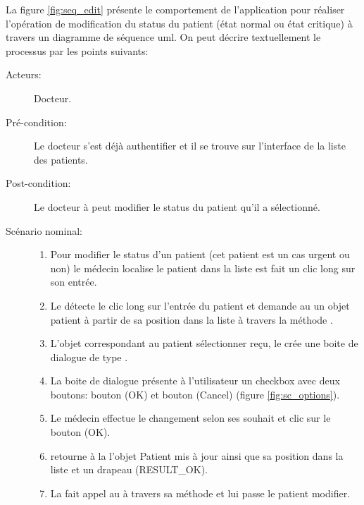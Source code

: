 La figure \ref{fig:seq_edit} présente le comportement de l'application pour réaliser l'opération de modification du status du patient (état normal ou état critique) à travers un diagramme de séquence \gls{uml}. On peut décrire textuellement le processus par les points suivants:

\begin{description}

\item[Acteurs:] Docteur.

\item[Pré-condition:] Le docteur s'est déjà authentifier et il se trouve sur l'interface de la liste des patients.

\item[Post-condition:] Le docteur à peut modifier le status du patient qu'il a sélectionné.

\item[Scénario nominal:]

\begin{enumerate}

\item Pour modifier le status d'un patient (cet patient est un cas urgent ou non) le médecin localise le patient dans la liste est fait un clic long sur son entrée.

\item Le  détecte le clic long sur l'entrée du patient et demande au  un objet patient à partir de sa position dans la liste à travers la méthode .

\item L'objet  correspondant au patient sélectionner reçu, le  crée une boite de dialogue de type .

\item La boite de dialogue  présente à l'utilisateur un checkbox avec deux boutons: bouton (OK) et bouton (Cancel) (figure \ref{fig:sc_options}).

\item Le médecin effectue le changement selon ses souhait et clic sur le bouton (OK).\label{item:alt}

\item {} retourne à la  l'objet Patient
mis à jour ainsi que sa position dans la liste et un drapeau
(RESULT\_OK).

\item La  fait appel au  à travers sa méthode  et lui passe le patient modifier.


\end{enumerate}
\end{description}

